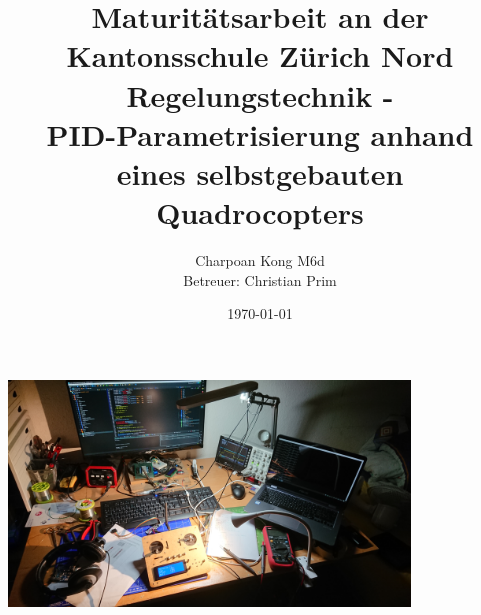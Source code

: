 \documentclass[12pt,a4paper, ngerman]{article}
\begin{document}
\title{\large Maturitätsarbeit an der Kantonsschule Zürich Nord \\ \Huge Regelungstechnik - \\ \huge PID-Parametrisierung anhand eines selbstgebauten Quadrocopters}
\author{Charpoan Kong M6d \\ Betreuer: Christian Prim}
\date{\today}
\maketitle
\begin{center}
\includegraphics[width=0.8\textwidth,trim=0 -40cm 0 -40cm]{titel.jpg}
\end{center}

\newpage
\clearpage
{}
\tableofcontents
\newpage
{}
\end{document}
